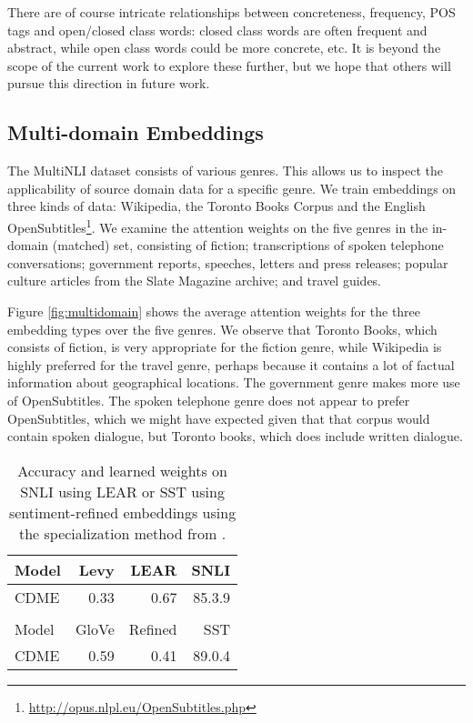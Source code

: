 \documentclass[11pt,a4paper]{article}
\begin{document}
There are of course intricate relationships between concreteness, frequency, POS tags and open/closed class words: closed class words are often frequent and abstract, while open class words could be more concrete, etc. It is beyond the scope of the current work to explore these further, but we hope that others will pursue this direction in future work.

\subsection{Multi-domain Embeddings}

The MultiNLI dataset consists of various genres. This allows us to inspect the applicability of source domain data for a specific genre. We train embeddings on three kinds of data: Wikipedia, the Toronto Books Corpus \cite{Zhu:2015iccv} and the English OpenSubtitles\footnote{\url{http://opus.nlpl.eu/OpenSubtitles.php}}. We examine the attention weights on the five genres in the in-domain (matched) set, consisting of fiction; transcriptions of spoken telephone conversations; government reports, speeches, letters and press releases; popular culture articles from the Slate Magazine archive; and travel guides.

Figure \ref{fig:multidomain} shows the average attention weights for the three embedding types over the five genres. We observe that Toronto Books, which consists of fiction, is very appropriate for the fiction genre, while Wikipedia is highly preferred for the travel genre, perhaps because it contains a lot of factual information about geographical locations. The government genre makes more use of OpenSubtitles. The spoken telephone genre does not appear to prefer OpenSubtitles, which we might have expected given that that corpus would contain spoken dialogue, but Toronto books, which does include written dialogue.

\begin{table}[t]
  \centering
  \begin{tabular}{lrr|r}
    \toprule
    Model & Levy & LEAR & SNLI\\
    \midrule
    CDME & 0.33 & 0.67 & 85.3.9\\
	& & & \\
    \toprule
    Model & GloVe & Refined & SST\\
    \midrule
    CDME & 0.59 & 0.41 & 89.0.4\\
    \bottomrule
  \end{tabular}
  \caption{\label{table:specialization} Accuracy and learned weights on SNLI using LEAR \cite{Vulic:2017arxiv} or SST using sentiment-refined embeddings using the specialization method from .}
\end{table}
\end{document}
